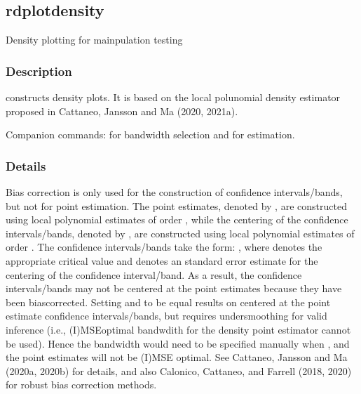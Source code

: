 \documentclass[letterpaper,10pt,english]{sphinxmanual}
\begin{document}
\sphinxstepscope


\subsection{rdplotdensity}
\label{\detokenize{rdplotdensity:rdplotdensity}}\label{\detokenize{rdplotdensity::doc}}
\sphinxAtStartPar
Density plotting for mainpulation testing


\subsubsection{Description}
\label{\detokenize{rdplotdensity:description}}
\sphinxAtStartPar
{} constructs density plots.
It is based on the local polunomial density estimator proposed in Cattaneo, Jansson and Ma (2020, 2021a).

\sphinxAtStartPar
Companion commands:  for bandwidth selection and  for estimation.


\subsubsection{Details}
\label{\detokenize{rdplotdensity:details}}
\sphinxAtStartPar
Bias correction is only used for the construction of confidence intervals/bands, but not for point
estimation. The point estimates, denoted by , are constructed using local polynomial estimates
of order , while the centering of the confidence intervals/bands, denoted by , are constructed
using local polynomial estimates of order . The confidence intervals/bands take the form:
\sphinxstyleemphasis{{[}f\_q \sphinxhyphen{} cv * SE(f\_q) , f\_q + cv * SE(f\_q){]}}, where  denotes the appropriate critical value and 
denotes an standard error estimate for the centering of the confidence interval/band. As a result,
the confidence intervals/bands may not be centered at the point estimates because they have been bias\sphinxhyphen{}corrected.
Setting  and  to be equal results on centered at the point estimate confidence intervals/bands,
but requires undersmoothing for valid inference (i.e., (I)MSE\sphinxhyphen{}optimal bandwdith for the density point estimator
cannot be used). Hence the bandwidth would need to be specified manually when , and the
point estimates will not be (I)MSE optimal. See Cattaneo, Jansson and Ma (2020a, 2020b) for details, and also
Calonico, Cattaneo, and Farrell (2018, 2020) for robust bias correction methods.
\end{document}
